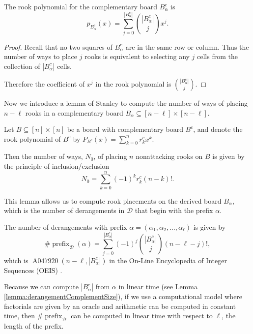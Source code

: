 \begin{lemma}
  The rook polynomial for the complementary board $B_\alpha^c$ is \begin{equation}
    p_{B_\alpha^c}(x) = \sum_{j = 0}^{|B_\alpha^c|} \binom{|B_\alpha^c|}{j}x^j.
  \end{equation}
\end{lemma}
\begin{proof}
  Recall that no two squares of $B^c_\alpha$ are in the same row or column.
  Thus the number of ways to place $j$ rooks is equivalent to selecting any
  $j$ cells from the collection of $|B^c_\alpha|$ cells.

  Therefore the coefficient of $x^j$ in the rook polynomial is
  $\binom{|B_\alpha^c|}{j}$.
\end{proof}

Now we introduce a lemma of Stanley \cite{Stanley2011EC1} to compute the number
of ways of placing $n - \ell$ rooks in a complementary board
$B_\alpha \subseteq [n - \ell] \times [n - \ell]$.

\begin{lemma}
  Let $B \subseteq [n] \times [n]$ be a board with complementary board $B^c$,
  and denote the rook polynomial of $B^c$ by
  $P_{B^c}(x) = \sum_{k=0}^n r^c_k x^k$.

  Then the number of ways, $N_0$, of placing $n$ nonattacking rooks on $B$
  is given by the principle of inclusion/exclusion
  \[
    N_0 = \sum_{k=0}^n (-1)^k r^c_k (n-k)!.
  \]
  \label{lemma:CountsFromComplementaryPolynomials}
\end{lemma}

This lemma allows us to compute rook placements on the derived board $B_\alpha$,
which is the number of derangements in $\mathcal{D}$ that begin with the prefix
$\alpha$.
\begin{corollary}
  The number of derangements with prefix
  $\alpha = (\alpha_1, \alpha_2, \dots, \alpha_\ell)$
  is given by \[
    \#\operatorname{prefix}_\mathcal{D}(\alpha)
    = \sum_{j=0}^{|B_\alpha^c|} (-1)^j \binom{|B_\alpha^c|}{j}(n-\ell-j)!,
  \] which is $\operatorname{A047920}(n-\ell, |B_\alpha^c|)$ in
  the On-Line Encyclopedia of Integer Sequences (OEIS) \cite{oeis}.
\end{corollary}

Because we can compute $|B_\alpha^c|$ from $\alpha$ in linear time
(see Lemma \ref{lemma:derangementComplementSize}), if we use a computational
model where factorials are given by an oracle and arithmetic can be computed
in constant time, then $\#\operatorname{prefix}_\mathcal{D}$ can be computed
in linear time with respect to $\ell$, the length of the prefix.

